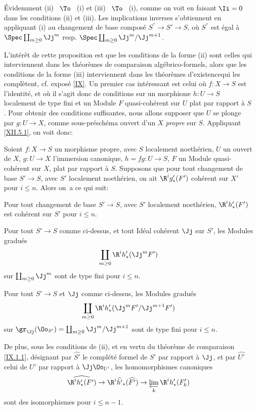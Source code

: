 \'Evidemment (ii) ~$\To$~ (i) et (iii) ~$\To$~ (i), comme on voit en faisant $\Ii=0$ dans les conditions (ii) et (iii). Les implications inverses s'obtiennent en appliquant (i) au changement de base compos\'e $S^{''}\to S'\to S$, o\`u $S^{''}$ est \'egal \`a $\Spec \coprod_{m\geq 0} \Jj^m$ resp. $\Spec \coprod_{m\geq 0} \Jj^m/\Jj^{m+1}$.

L'int\'er\^et de cette proposition est que les conditions de la forme (ii) sont celles qui interviennent dans les \og th\'eor\`emes de comparaison alg\'ebrico-formels\fg, alors que les conditions de la forme (iii) interviennent dans les \og th\'eor\`emes d'existence\fg qui les compl\`etent, cf. expos\'e \ref{IX}. Un premier cas int\'eressant est celui o\`u $f:X\to S$ est l'identit\'e, et o\`u il s'agit donc de conditions sur un morphisme $h:U\to S$ localement de type fini et un Module $F$ quasi-coh\'erent sur $U$ plat par rapport \`a $S$. Pour obtenir des conditions suffisantes, nous allons supposer que $U$ se plonge par $g:U\to X$, comme sous-pr\'esch\'ema ouvert d'un $X$ \emph{propre} sur $S$. Appliquant \ref{XII.5.1}, on voit donc:

\begin{corollaire} \label{XII.5.8}
Soient $f:X\to S$ un morphisme propre, avec $S$ localement noeth\'erien, $U$ un ouvert de $X$, $g:U\to X$ l'immersion canonique, $h=fg:U\to S$, $F$ un Module quasi-coh\'erent sur $X$, plat par rapport \`a $S$. Supposons que pour tout changement de base $S'\to S$, avec $S'$ localement noeth\'erien, on ait $\R^ig'_\ast(F')$ coh\'erent sur $X'$ pour $i\leq n$. Alors on~a ce qui suit:
\begin{enumeratei}
\item
Pour tout changement de base $S'\to S$, avec $S'$ localement noeth\'erien, $\R^ih'_\ast(F')$ est coh\'erent sur $S'$ pour $i\leq n$.
\item
Pour tout $S'\to S$ comme ci-dessus, et tout Id\'eal coh\'erent $\Jj$ sur $S'$, les Modules gradu\'es
\[
\coprod_{m\geq 0} \R^ih'_\ast(\Jj^mF')
\]
sur $\coprod_{m\geq 0}\Jj^m$ sont de type fini pour $i\leq n$.
\item
Pour tout $S'\to S$ et $\Jj$ comme ci-dessus, les Modules gradu\'es
\[
\coprod_{m\geq 0} \R^ih'_\ast(\Jj^mF'/\Jj^{m+1}F')
\]
sur $\gr_\Jj(\Oo_{S'})=\coprod_{m\geq 0}\Jj^m/\Jj^{m+1}$ sont de type fini pour $i\leq n$.

De plus, sous les conditions de (ii), et en vertu du th\'eor\`eme de comparaison \ref{IX.1.1}, d\'esignant par $\widehat{S'}$ le compl\'et\'e formel de $S'$ par rapport \`a $\Jj$, et par $\widehat{U'}$ celui de $U'$ par rapport \`a $\Jj\Oo_{U'}$, les homomorphismes canoniques
\[
\widehat{\R^ih'_\ast(F')} \to \R^i\widehat{h'}_\ast(\widehat{F'}) \to \varprojlim_k\R^ih'_\ast(F'_k)
\]
sont des isomorphismes pour $i\leq n-1$.
\end{enumeratei}
\end{corollaire}

